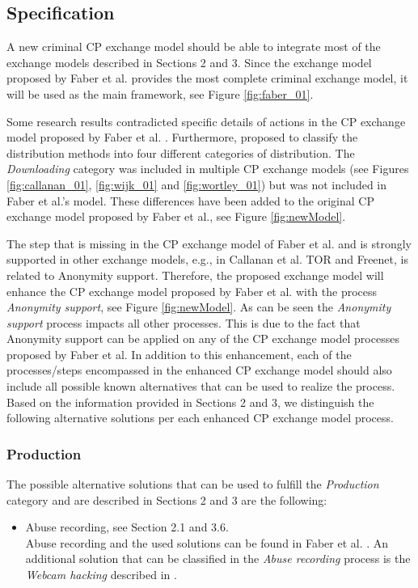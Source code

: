 \documentclass{sig-alternate-br}
\begin{document}
\subsection{Specification}
A new criminal CP exchange model should be able to integrate most of the exchange models described in Sections 2 and 3. 
Since the exchange model proposed by Faber et al. \cite{en2011phishing} provides the most complete criminal exchange model, it will be used as the main framework, see Figure \ref{fig:faber_01}.

Some research results contradicted specific details of actions in the CP exchange model proposed by Faber et al. \cite{quayle2002paedophiles,krone2005international}. Furthermore, \cite{wijk2009achter} proposed to classify the distribution methods into four different categories of distribution. The \textit{Downloading} category was included in multiple CP exchange models (see Figures \ref{fig:callanan_01}, \ref{fig:wijk_01} and \ref{fig:wortley_01}) but was not included in Faber et al.'s model.
These differences have been added to the original CP exchange model proposed by Faber et al., see Figure \ref{fig:newModel}.

The step that is missing in the CP exchange model of Faber et al. and is strongly supported in other exchange models, e.g., in Callanan et al. \cite{callanan2009internet} TOR and Freenet, is related to Anonymity support. Therefore, the proposed exchange model will enhance the CP exchange model proposed by Faber et al. with the process \textit{Anonymity support}, see Figure \ref{fig:newModel}. As can be seen the \textit{Anonymity support} process impacts all other processes. This is due to the fact that Anonymity support can be applied on any of the CP exchange model processes proposed by Faber et al.
In addition to this enhancement, each of the processes/steps encompassed in the enhanced CP exchange model should also include all possible known alternatives that can be used to realize the process. 
Based on the information provided in Sections 2 and 3, we distinguish the following alternative solutions per each enhanced CP exchange model process.
\subsubsection{Production}
The possible alternative solutions that can be used to fulfill the \textit{Production} category and are described in Sections 2 and 3 are the following:
\begin{itemize}
	\item Abuse recording, see Section 2.1 and 3.6.\\
		Abuse recording and the used solutions can be found in Faber et al. \cite{en2011phishing}. An additional solution that can be classified in the \textit{Abuse recording} process is the \textit{Webcam hacking} described in \cite{mishna2009ongoing,salomon2010examples}.
\end{itemize}
\end{document}
